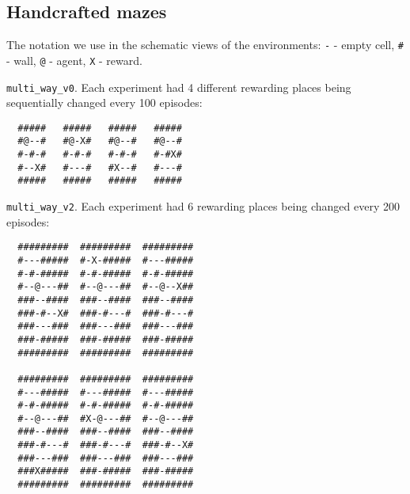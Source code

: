 \documentclass[a4paper,twoside]{article}
\begin{document}
\subsection{Handcrafted mazes} \label{apx_handcrafted_mazes}

The notation we use in the schematic views of the environments: \verb|-| - empty cell, \verb|#| - wall, \verb|@| - agent, \verb|X| - reward.

\texttt{multi\_way\_v0}. Each experiment had 4 different rewarding places being sequentially changed every 100 episodes:

\begin{verbatim}
  #####   #####   #####   #####
  #@--#   #@-X#   #@--#   #@--#
  #-#-#   #-#-#   #-#-#   #-#X#
  #--X#   #---#   #X--#   #---#
  #####   #####   #####   #####
\end{verbatim}

\texttt{multi\_way\_v2}. Each experiment had 6 rewarding places being changed every 200 episodes:

\begin{verbatim}
  #########  #########  #########
  #---#####  #-X-#####  #---#####
  #-#-#####  #-#-#####  #-#-#####
  #--@---##  #--@---##  #--@--X##
  ###--####  ###--####  ###--####
  ###-#--X#  ###-#---#  ###-#---#
  ###---###  ###---###  ###---###
  ###-#####  ###-#####  ###-#####
  #########  #########  #########

  #########  #########  #########
  #---#####  #---#####  #---#####
  #-#-#####  #-#-#####  #-#-#####
  #--@---##  #X-@---##  #--@---##
  ###--####  ###--####  ###--####
  ###-#---#  ###-#---#  ###-#--X#
  ###---###  ###---###  ###---###
  ###X#####  ###-#####  ###-#####
  #########  #########  #########
\end{verbatim}
\end{document}
